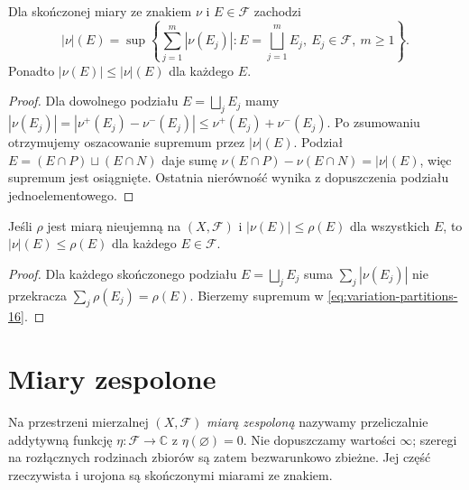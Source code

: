 \begin{twierdzenie}
\label{thm:partition-variation-16}
Dla skończonej miary ze znakiem $\nu$ i $E\in\mathcal F$
zachodzi
\begin{equation}\label{eq:variation-partitions-16}
|\nu|(E)=\sup\left\{\sum_{j=1}^m|\nu(E_j)|:
E=\bigsqcup_{j=1}^mE_j,\ E_j\in\mathcal F,\ m\ge1\right\}.
\end{equation}
Ponadto $|\nu(E)|\le|\nu|(E)$ dla każdego $E$.
\end{twierdzenie}
\begin{proof}
Dla dowolnego podziału $E=\bigsqcup_jE_j$ mamy
$|\nu(E_j)|=|\nu^+(E_j)-\nu^-(E_j)|
\le\nu^+(E_j)+\nu^-(E_j)$.
Po zsumowaniu otrzymujemy oszacowanie supremum
przez $|\nu|(E)$. Podział $E=(E\cap P)\sqcup(E\cap N)$
daje sumę $\nu(E\cap P)-\nu(E\cap N)=|\nu|(E)$,
więc supremum jest osiągnięte. Ostatnia nierówność
wynika z dopuszczenia podziału jednoelementowego.
\end{proof}

\begin{wniosek}
\label{cor:minimal-variation-16}
Jeśli $\rho$ jest miarą nieujemną na $(X,\mathcal F)$
i $|\nu(E)|\le\rho(E)$ dla wszystkich $E$, to
$|\nu|(E)\le\rho(E)$ dla każdego $E\in\mathcal F$.
\end{wniosek}
\begin{proof}
Dla każdego skończonego podziału
$E=\bigsqcup_jE_j$ suma $\sum_j|\nu(E_j)|$
nie przekracza $\sum_j\rho(E_j)=\rho(E)$.
Bierzemy supremum w \eqref{eq:variation-partitions-16}.
\end{proof}

\section{Miary zespolone}
\begin{definicja}
\label{def:complex-measure-16}
Na przestrzeni mierzalnej $(X,\mathcal F)$
\emph{miarą zespoloną} nazywamy przeliczalnie addytywną
funkcję $\eta:\mathcal F\to\mathbb C$ z $\eta(\varnothing)=0$.
Nie dopuszczamy wartości $\infty$; szeregi na rozłącznych
rodzinach zbiorów są zatem bezwarunkowo zbieżne.
Jej część rzeczywista i urojona są skończonymi
miarami ze znakiem.
\end{definicja}

